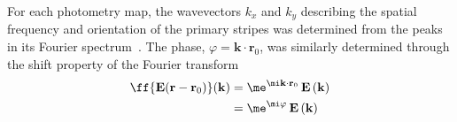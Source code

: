 For each photometry map, the wavevectors $k_x$ and $k_y$ describing the
spatial frequency and orientation of the primary stripes was determined
from the peaks in its Fourier spectrum~\cite{huntley1989speckle}.  The
phase, $\varphi=\mathbf{k}\cdot\mathbf{r}_0$, was similarly determined
through the shift property of the Fourier transform
\begin{align}
\ff{\mathbf{E}(\mathbf{r}-\mathbf{r}_0)}(\mathbf{k}) &= 
\me^{\mi \mathbf{k}\cdot \mathbf{r}_0}\,
\mathbf{E}\left(\mathbf{k}\right)\\
&= \me^{\mi \varphi}\, \mathbf{E}\left(\mathbf{k}\right)
\end{align}

